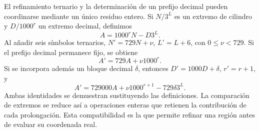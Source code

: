 El refinamiento ternario y la determinación de un prefijo decimal
pueden coordinarse mediante un único residuo entero. Si \(N/3^L\)
es un extremo de cilindro y \(D/1000^r\) un extremo decimal, definimos
\[
 A=1000^rN-D3^L.
\]
Al añadir seis símbolos ternarios, \(N'=729N+\nu\),
\(L'=L+6\), con \(0\le\nu<729\). Si el prefijo decimal permanece
fijo, se obtiene
\[
 A'=729A+\nu1000^r.
\]
Si se incorpora además un bloque decimal \(\delta\), entonces
\(D'=1000D+\delta\), \(r'=r+1\), y
\begin{equation}
 A'=729000A+\nu1000^{r+1}-729\delta3^L.
 \label{eq:residuo-dos-bases}
\end{equation}
Ambas identidades se demuestran sustituyendo las definiciones. La
comparación de extremos se reduce así a operaciones enteras que
retienen la contribución de cada prolongación. Esta compatibilidad
es la que permite refinar una región antes de evaluar su coordenada real.
